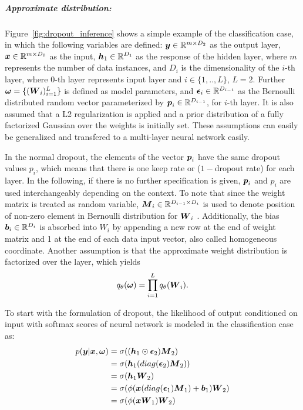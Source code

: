 \newpage %
\subparagraph{Approximate distribution:}
Figure~\ref{fig:dropout_inference} shows a simple example of the {classification} case, in which the following variables are defined: %
 $\boldsymbol y\in \mathbb R ^{m \times D_{2}}$ as the output layer, $\boldsymbol x \in \mathbb R^{m \times D_{0}}$ as the input, $\boldsymbol h_{1} \in \mathbb R^{D_{1}}$ as the response of the hidden layer, where $m$ represents the number of data instances, and $D_{i}$ is the dimensionality of the $i$-th layer, where $0$-th layer represents input layer and $i \in \{1,..,L\}$, $L=2$. Further $\boldsymbol \omega = \{ (\boldsymbol W_{i})_{i=1}^{L}  \}$ is defined as model parameters, and $\boldsymbol \epsilon_{i} \in \mathbb R^{D_{i-1}}$ as the Bernoulli distributed random vector parameterized by $\boldsymbol p_{i} \in \mathbb R^{D_{i-1}}$, for $i$-th layer. 
It is also assumed that a L2 regularization is applied and a prior distribution of a fully factorized Gaussian over the weights is initially set. These assumptions can easily be generalized and transfered to a multi-layer neural network easily. 

In the normal dropout, the elements of the vector $\boldsymbol p_{i}$ have the same dropout values $p_{i}$, which means that there is one keep rate or ($1-$dropout rate) for each layer. In the following, if there is no further specification is given, $\boldsymbol p_{i}$ and $p_{i}$ are used interchangeably depending on the context. To note that since the weight matrix is treated as random variable, $\boldsymbol M_{i} \in \mathbb R^{D_{i-1} \times D_{i}}$ is used to denote position of non-zero element in Bernoulli distribution for $\boldsymbol W_{i}$ . Additionally, the bias $\boldsymbol b_{i} \in \mathbb R^{D_{i}}$ is absorbed into $W_{i}$ by appending a new row at the end of weight matrix and 1 at the end of each data input vector, also called homogeneous coordinate. Another assumption is that the approximate weight distribution is factorized over the layer, which yields
\[
q_{\theta}(\boldsymbol \omega) = \prod_{i=1}^{L}q_{\theta}(\boldsymbol W_{i}). 
\]

To start with the formulation of dropout, the likelihood of output conditioned on input with softmax scores of neural network is modeled in the classification case as:
\begin{equation}
\begin{aligned} \label{dropout_form}
p(\boldsymbol y| \boldsymbol x, \boldsymbol \omega) & = \sigma((\boldsymbol h_{1} \odot \boldsymbol \epsilon_{2}) \boldsymbol M_{2})\\
& = \sigma(\boldsymbol h_{1} (diag(\boldsymbol \epsilon_{2}) \boldsymbol M_{2})) \\
& = \sigma(\boldsymbol h_{1} \boldsymbol W_{2}) \\
& = \sigma(\phi(\boldsymbol x (diag(\boldsymbol \epsilon_{1}) \boldsymbol M_{1})+ \boldsymbol b_{1}) \boldsymbol W_{2}) \\
& = \sigma(\phi(\boldsymbol x \boldsymbol W_{1})\boldsymbol W_{2})
\end{aligned}
\end{equation}

